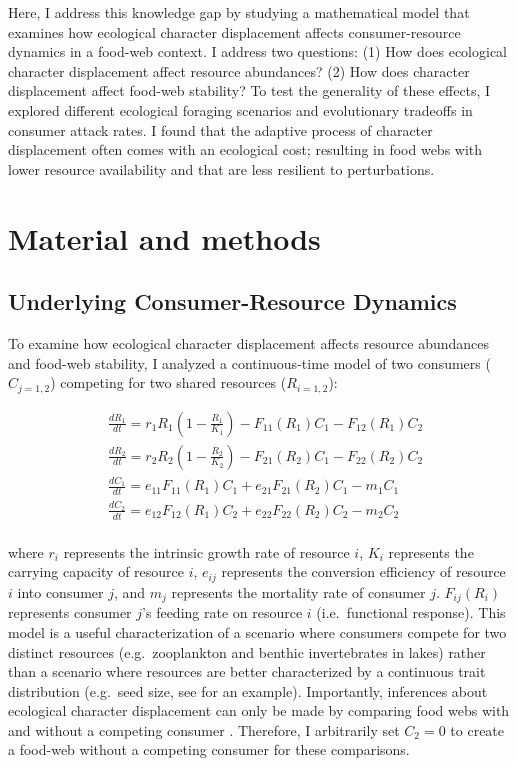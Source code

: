 \documentclass[11pt,]{article}
\begin{document}
Here, I address this knowledge gap by studying a mathematical model that
examines how ecological character displacement affects consumer-resource
dynamics in a food-web context. I address two questions: (1) How does
ecological character displacement affect resource abundances? (2) How
does character displacement affect food-web stability? To test the
generality of these effects, I explored different ecological foraging
scenarios and evolutionary tradeoffs in consumer attack rates. I found
that the adaptive process of character displacement often comes with an
ecological cost; resulting in food webs with lower resource availability
and that are less resilient to perturbations.

\section{Material and methods}\label{material-and-methods}

\subsection{Underlying Consumer-Resource
Dynamics}\label{underlying-consumer-resource-dynamics}

To examine how ecological character displacement affects resource
abundances and food-web stability, I analyzed a continuous-time model of
two consumers (\(C_{j=1,2}\)) competing for two shared resources
(\(R_{i=1,2}\)):

\begin{equation} \label{eq:1}
  \begin{split}
     & \frac{dR_1}{dt}=r_1R_1(1-\frac{R_1}{K_1})-F_{11}(R_1)C_1-F_{12}(R_1)C_2 \\
     & \frac{dR_2}{dt}=r_2R_2(1-\frac{R_2}{K_2})-F_{21}(R_2)C_1-F_{22}(R_2)C_2 \\
     & \frac{dC_1}{dt}=e_{11}F_{11}(R_1)C_1+e_{21}F_{21}(R_2)C_1-m_1C_1 \\
     & \frac{dC_2}{dt}=e_{12}F_{12}(R_1)C_2+e_{22}F_{22}(R_2)C_2-m_2C_2 \\
  \end{split}
\end{equation}

where \(r_i\) represents the intrinsic growth rate of resource \(i\),
\(K_i\) represents the carrying capacity of resource \(i\), \(e_{ij}\)
represents the conversion efficiency of resource \(i\) into consumer
\(j\), and \(m_j\) represents the mortality rate of consumer \(j\).
\(F_{ij}(R_i)\) represents consumer \(j\)'s feeding rate on resource
\(i\) (i.e.~functional response). This model is a useful
characterization of a scenario where consumers compete for two distinct
resources (e.g.~zooplankton and benthic invertebrates in lakes) rather
than a scenario where resources are better characterized by a continuous
trait distribution (e.g.~seed size, see \citet{Taper1985} for an
example). Importantly, inferences about ecological character
displacement can only be made by comparing food webs with and without a
competing consumer \citep{Schluter1992}. Therefore, I arbitrarily set
\(C_2=0\) to create a food-web without a competing consumer for these
comparisons.
\end{document}
